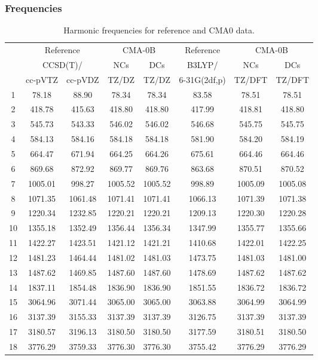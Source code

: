 \documentclass[10pt,oneside]{article}
\begin{document}
\subsubsection*{Frequencies}
\begin{table}[h!]
\centering
\caption{Harmonic frequencies for reference and CMA0 data.}
\begin{tabular}{cccccccc}
\toprule
{} & \multicolumn{2}{c}{Reference} & \multicolumn{2}{c}{CMA-0B} &    Reference & \multicolumn{2}{c}{CMA-0B} \\
{} & \multicolumn{2}{c}{CCSD(T)/} &     NCs &     DCs &       B3LYP/ &     NCs &     DCs \\
{} &   cc-pVTZ & cc-pVDZ &   TZ/DZ &   TZ/DZ & 6-31G(2df,p) &  TZ/DFT &  TZ/DFT \\
\midrule
1  &     78.18 &   88.90 &   78.34 &   78.34 &        83.58 &   78.51 &   78.51 \\
2  &    418.78 &  415.63 &  418.80 &  418.80 &       417.99 &  418.81 &  418.80 \\
3  &    545.73 &  543.33 &  546.02 &  546.02 &       546.68 &  545.75 &  545.75 \\
4  &    584.13 &  584.16 &  584.18 &  584.18 &       581.90 &  584.20 &  584.19 \\
5  &    664.47 &  671.94 &  664.25 &  664.26 &       675.61 &  664.46 &  664.46 \\
6  &    869.68 &  872.92 &  869.77 &  869.76 &       863.68 &  870.51 &  870.52 \\
7  &   1005.01 &  998.27 & 1005.52 & 1005.52 &       998.89 & 1005.09 & 1005.08 \\
8  &   1071.35 & 1061.48 & 1071.41 & 1071.41 &      1066.13 & 1071.39 & 1071.38 \\
9  &   1220.34 & 1232.85 & 1220.21 & 1220.21 &      1209.13 & 1220.30 & 1220.28 \\
10 &   1355.18 & 1352.49 & 1356.44 & 1356.34 &      1347.99 & 1355.77 & 1355.66 \\
11 &   1422.27 & 1423.51 & 1421.12 & 1421.21 &      1410.68 & 1422.01 & 1422.25 \\
12 &   1481.23 & 1464.44 & 1481.02 & 1481.03 &      1473.75 & 1481.03 & 1481.00 \\
13 &   1487.62 & 1469.85 & 1487.60 & 1487.60 &      1478.69 & 1487.62 & 1487.62 \\
14 &   1837.11 & 1854.48 & 1836.90 & 1836.90 &      1851.55 & 1836.72 & 1836.72 \\
15 &   3064.96 & 3071.44 & 3065.00 & 3065.00 &      3063.88 & 3064.99 & 3064.99 \\
16 &   3137.39 & 3155.33 & 3137.39 & 3137.39 &      3126.75 & 3137.39 & 3137.39 \\
17 &   3180.57 & 3196.13 & 3180.50 & 3180.50 &      3177.59 & 3180.51 & 3180.50 \\
18 &   3776.29 & 3759.33 & 3776.30 & 3776.30 &      3755.42 & 3776.29 & 3776.29 \\
\bottomrule
\end{tabular}
\end{table}
\end{document}
